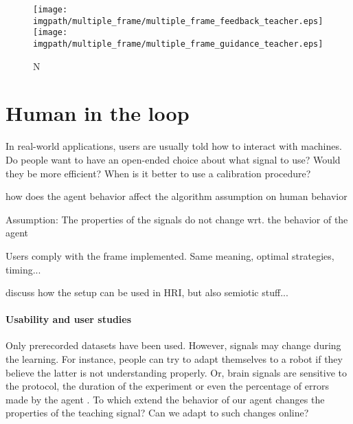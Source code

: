 \begin{figure}[!ht]
\centering
\texttt{[image: \\imgpath/multiple\_frame/multiple\_frame\_feedback\_teacher.eps]}
\texttt{[image: \\imgpath/multiple\_frame/multiple\_frame\_guidance\_teacher.eps]}
\caption{N}
\label{fig:multipleframefeedbackvsguidance}
\end{figure} 


\section{Human in the loop}

In real-world applications, users are usually told how to interact with machines. Do people want to have an open-ended choice about what signal to use? Would they be more efficient? When is it better to use a calibration procedure?

how does the agent behavior affect the algorithm assumption on human behavior

Assumption: The properties of the signals do not change wrt. the behavior of the agent

Users comply with the frame implemented. Same meaning, optimal strategies, timing...

discuss how the setup can be used in HRI, but also semiotic stuff...

\paragraph{Usability and user studies}

Only prerecorded datasets have been used. However, signals may change during the learning. For instance, people can try to adapt themselves to a robot if they believe the latter is not understanding properly. Or, brain signals are sensitive to the protocol, the duration of the experiment or even the percentage of errors made by the agent \cite{chavarriaga2010learning}. To which extend the behavior of our agent changes the properties of the teaching signal? Can we adapt to such changes online? 

